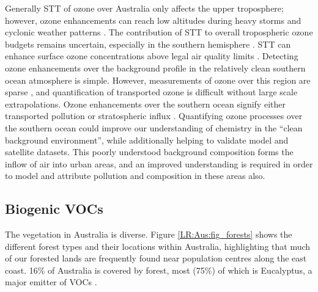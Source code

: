     
    Generally STT of ozone over Australia only affects the upper troposphere; however, ozone enhancements can reach low altitudes during heavy storms and cyclonic weather patterns \parencite{Alexander2013}.
    The contribution of STT to overall tropospheric ozone budgets remains uncertain, especially in the southern hemisphere \parencite{Skerlak2014}.
    STT can enhance surface ozone concentrations above legal air quality limits 
    \parencite[e.g.,][]{Lelieveld2009, Lin2015}.
    Detecting ozone enhancements over the background profile in the relatively clean southern ocean atmosphere is simple.
    However, measurements of ozone over this region are sparse \parencite{Skerlak2014}, and quantification of transported ozone is difficult without large scale extrapolations.
    Ozone enhancements over the southern ocean signify either transported pollution or stratospheric influx \parencite{Jacobson2000}.
    Quantifying ozone processes over the southern ocean could improve our understanding of chemistry in the ``clean background environment'', while additionally helping to validate model and satellite datasets.
    This poorly understood background composition forms the inflow of air into urban areas, and an improved understanding is required in order to model and attribute pollution and composition in these areas also.
  
  
  \subsection{Biogenic VOCs}
    
    The vegetation in Australia is diverse.
    Figure \ref{LR:Aus:fig_forests} shows the different forest types and their locations within Australia, highlighting that much of our forested lands are frequently found near population centres along the east coast.
    16\% of Australia is covered by forest, most (75\%) of which is Eucalyptus, a major emitter of VOCs \parencite{Guenther2012}.
    
    
